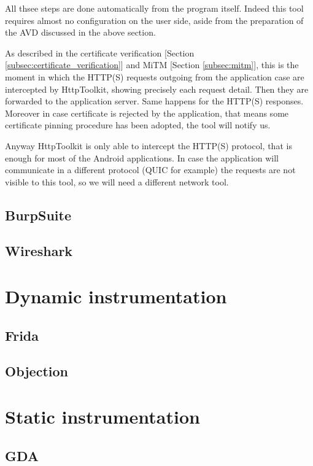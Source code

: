 			\par All thsee steps are done automatically from the program itself. Indeed this tool requires almost no configuration on the user side, aside from the preparation of the AVD discussed in the above section.
			\par	As described in the certificate verification [Section \ref{subsec:certificate_verification}] and MiTM [Section \ref{subsec:mitm}], this is the moment in which the HTTP(S) requests outgoing from the application case are intercepted by HttpToolkit, showing precisely each request detail. Then they are forwarded to the application server. Same happens for the HTTP(S) responses. Moreover in case certificate is rejected by the application, that means some certificate pinning procedure has been adopted, the tool will notify us.
			\par Anyway HttpToolkit is only able to intercept the HTTP(S) protocol, that is enough for most of the Android applications. In case the application will communicate in a different protocol (QUIC for example) the requests are not visible to this tool, so we will need a different network tool.
		
		\subsection{BurpSuite}
		\label{sec:burp_suite}
		
		\subsection{Wireshark}
		\label{sec:wireshark}
		
	
	\section{Dynamic instrumentation}
		\subsection{Frida}
		\subsection{Objection}
		
	\section{Static instrumentation}
		\subsection{GDA}
